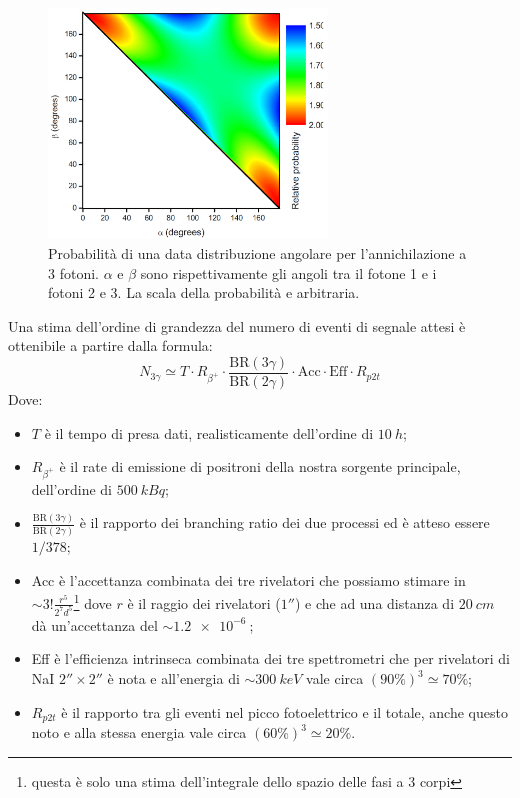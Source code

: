 \begin{figure}[h]
	\centering
	\includegraphics[width=20em]{immagini/3gamma_distribution}
	\caption{\label{fig:3gamma_angular_distr}Probabilità di una data distribuzione angolare per l'annichilazione a 3 fotoni. $\alpha$ e $\beta$ sono rispettivamente gli angoli tra il fotone 1 e i fotoni 2 e 3. La scala della probabilità e arbitraria.}
\end{figure}


Una stima dell'ordine di grandezza del numero di eventi di segnale attesi è ottenibile a partire dalla formula:
\begin{equation}
\label{eq:stima_3gamma}
N_{3\gamma} \simeq T \cdot R_{\beta^+} \cdot \frac{\text{BR}(3\gamma)}{\text{BR}(2\gamma)} \cdot \text{Acc} \cdot \text{Eff} \cdot R_{p2t}
\end{equation}
Dove:
\begin{itemize}
	\item $T$ è il tempo di presa dati, realisticamente dell'ordine di $\SI{10}{h}$;
	\item $R_{\beta^+}$ è il rate di emissione di positroni della nostra sorgente principale, dell'ordine di $\SI{500}{kBq}$;
	\item $\frac{\text{BR}(3\gamma)}{\text{BR}(2\gamma)}$ è il rapporto dei branching ratio dei due processi ed è atteso essere $1/378$;
	\item Acc è l'accettanza combinata dei tre rivelatori che possiamo stimare in $\sim 3!\frac{r^5}{2^7 d^5}$\footnote{questa è solo una stima dell'integrale dello spazio delle fasi a 3 corpi} dove $r$ è il raggio dei rivelatori ($1''$) e che ad una distanza di $\SI{20}{cm}$ dà un'accettanza del $\sim\SI{1.2e-6}{}$;
	\item Eff è l'efficienza intrinseca combinata dei tre spettrometri che per rivelatori di NaI $2''\times2''$ è nota \cite{knoll} e all'energia di $\sim \SI{300}{keV}$ vale circa $(90\%)^3 \simeq  70\%$;
	\item $R_{p2t}$ è il rapporto tra gli eventi nel picco fotoelettrico e il totale, anche questo noto \cite{knoll} e alla stessa energia vale circa $(60\%)^3 \simeq 20\%$.
\end{itemize}
